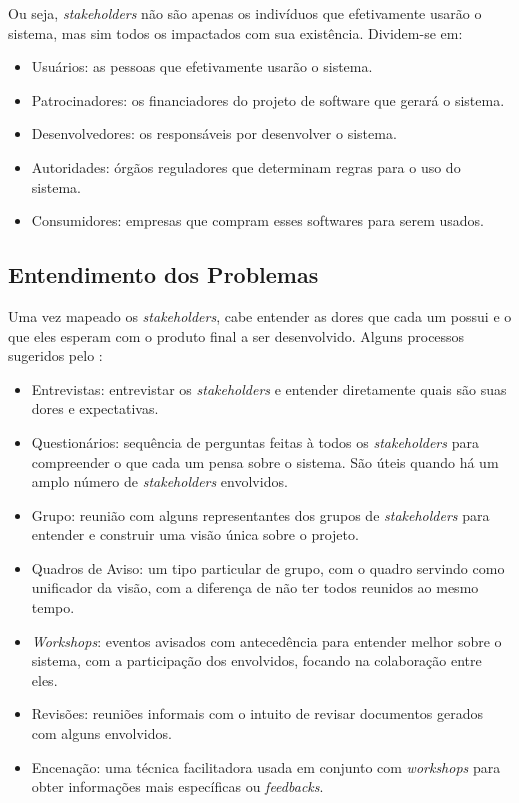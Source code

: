 Ou seja, \textit{stakeholders} não são apenas os indivíduos que efetivamente usarão o sistema, mas sim todos os impactados com sua existência. Dividem-se em:

\begin{itemize}
    \item Usuários: as pessoas que efetivamente usarão o sistema.
    \item Patrocinadores: os financiadores do projeto de software que gerará o sistema.
    \item Desenvolvedores: os responsáveis por desenvolver o sistema.
    \item Autoridades: órgãos reguladores que determinam regras para o uso do sistema.
    \item Consumidores: empresas que compram esses softwares para serem usados.
\end{itemize}

\subsection{Entendimento dos Problemas}
Uma vez mapeado os \textit{stakeholders}, cabe entender as dores que cada um possui e o que eles esperam com o produto final a ser desenvolvido. Alguns processos sugeridos pelo \citeauthor{kurtbittnerianspence2002}:

\begin{itemize}
    \item Entrevistas: entrevistar os \textit{stakeholders} e entender diretamente quais são suas dores e expectativas.
    \item Questionários: sequência de perguntas feitas à todos os \textit{stakeholders} para compreender o que cada um pensa sobre o sistema. São úteis quando há um amplo número de \textit{stakeholders} envolvidos.
    \item Grupo: reunião com alguns representantes dos grupos de \textit{stakeholders} para entender e construir uma visão única sobre o projeto.
    \item Quadros de Aviso: um tipo particular de grupo, com o quadro servindo como unificador da visão, com a diferença de não ter todos reunidos ao mesmo tempo.
    \item \textit{Workshops}: eventos avisados com antecedência para entender melhor sobre o sistema, com a participação dos envolvidos, focando na colaboração entre eles.
    \item Revisões: reuniões informais com o intuito de revisar documentos gerados com alguns envolvidos.
    \item Encenação: uma técnica facilitadora usada em conjunto com \textit{workshops} para obter informações mais específicas ou \textit{feedbacks}.
\end{itemize}

